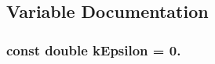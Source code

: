\subsection{Variable Documentation}
\hypertarget{a00220_acf67607e9e6dd5986836b79ce28b80c4}{
\subsubsection[{k\-Epsilon}]{\setlength{\rightskip}{0pt plus 5cm}const double k\-Epsilon = 0.\hspace{0.3cm}{\ttfamily [static]}}}\label{a00220_acf67607e9e6dd5986836b79ce28b80c4}
